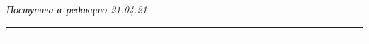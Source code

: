 \vspace*{-10pt}





\hfill{\small\textit{Поступила в~редакцию 21.04.21}}





\vspace*{6pt}





\hrule





\vspace*{2pt}















\hrule





\vspace*{-2pt}





\def\tit{RESEARCH AND DEVELOPMENT STRATEGY\\ IN~THE~FIELD 


OF~ARTIFICIAL INTELLIGENCE~IV:\\ CHINESE GOVERNMENT POLICY\\[-5pt]}








\def\titkol{Research and development strategy in~the~field 


of~artificial intelligence~IV: Chinese %


policy}





\def\aut{A.\,V.~Borisov, A.\,V.~Bosov, and D.\,V.~Zhukov}





\def\autkol{A.\,V.~Borisov, A.\,V.~Bosov, and D.\,V.~Zhukov}





